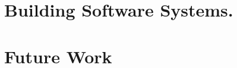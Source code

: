 \documentclass[a4paper, 11pt]{article}
\begin{document}
\begin{small}
\section*{\large Building Software Systems.}



\section*{Future Work}


\begin{comment}

Furthermore, once a feature is introduced in one of the BSDs, it suffers significant delay, on
average three releases, to propagate to other BSDs.


In summary, this study shows that the upkeep effort of maintaining forked variant products is
significant and calls for new techniques to automate porting. The findings of this study was
published in ACM SIGSOFT International Symposium on the Foundations of Software Engineering
(FSE 2012)~\cite{Ray2012}.



\end{comment}
\end{small}
\end{document}
